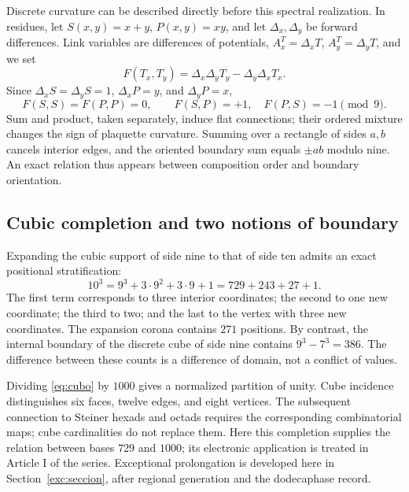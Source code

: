 Discrete curvature can be described directly before this spectral realization. In residues, let \(S(x,y)=x+y\), \(P(x,y)=xy\), and let \(\Delta_x,\Delta_y\) be forward differences. Link variables are differences of potentials, \(A_x^T=\Delta_xT\), \(A_y^T=\Delta_yT\), and we set
\[
 F(T_x,T_y)=\Delta_x\Delta_yT_y-\Delta_y\Delta_xT_x.
\]
Since \(\Delta_xS=\Delta_yS=1\), \(\Delta_xP=y\), and \(\Delta_yP=x\),
\begin{equation}
 F(S,S)=F(P,P)=0,\qquad F(S,P)=+1,\quad F(P,S)=-1\pmod9.
\end{equation}
Sum and product, taken separately, induce flat connections; their ordered mixture changes the sign of plaquette curvature. Summing over a rectangle of sides \(a,b\) cancels interior edges, and the oriented boundary sum equals \(\pm ab\) modulo nine. An exact relation thus appears between composition order and boundary orientation.

\subsection{Cubic completion and two notions of boundary}

Expanding the cubic support of side nine to that of side ten admits an exact positional stratification:
\begin{equation}
 10^3=9^3+3\cdot9^2+3\cdot9+1=729+243+27+1.
 \label{eq:cubo}
\end{equation}
The first term corresponds to three interior coordinates; the second to one new coordinate; the third to two; and the last to the vertex with three new coordinates. The expansion corona contains \(271\) positions. By contrast, the internal boundary of the discrete cube of side nine contains \(9^3-7^3=386\). The difference between these counts is a difference of domain, not a conflict of values.

Dividing \eqref{eq:cubo} by \(1000\) gives a normalized partition of unity. Cube incidence distinguishes six faces, twelve edges, and eight vertices. The subsequent connection to Steiner hexads and octads requires the corresponding combinatorial maps; cube cardinalities do not replace them. Here this completion supplies the relation between bases \(729\) and \(1000\);
its electronic application is treated in Article I of the series.
Exceptional prolongation is developed here in Section~\ref{exc:seccion},
after regional generation and the dodecaphase record.





